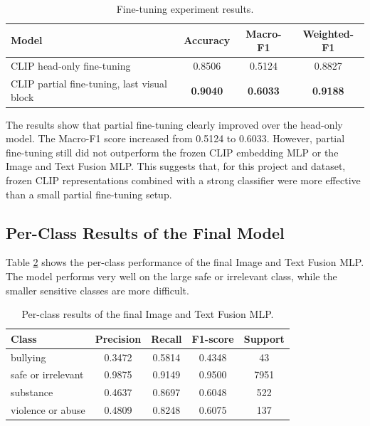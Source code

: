 \documentclass[12pt]{article}
\begin{document}
\begin{table}[H]
\centering
\begin{tabular}{lccc}
\toprule
\textbf{Model} & \textbf{Accuracy} & \textbf{Macro-F1} & \textbf{Weighted-F1} \\
\midrule
CLIP head-only fine-tuning & 0.8506 & 0.5124 & 0.8827 \\
CLIP partial fine-tuning, last visual block & \textbf{0.9040} & \textbf{0.6033} & \textbf{0.9188} \\
\bottomrule
\end{tabular}
\caption{Fine-tuning experiment results.}
\label{tab:fine_tuning_results}
\end{table}

The results show that partial fine-tuning clearly improved over the head-only model. The Macro-F1 score increased from 0.5124 to 0.6033. However, partial fine-tuning still did not outperform the frozen CLIP embedding MLP or the Image and Text Fusion MLP. This suggests that, for this project and dataset, frozen CLIP representations combined with a strong classifier were more effective than a small partial fine-tuning setup.

\subsection{Per-Class Results of the Final Model}

Table \ref{tab:per_class_final} shows the per-class performance of the final Image and Text Fusion MLP. The model performs very well on the large safe or irrelevant class, while the smaller sensitive classes are more difficult.

\begin{table}[H]
\centering
\begin{tabular}{lcccc}
\toprule
\textbf{Class} & \textbf{Precision} & \textbf{Recall} & \textbf{F1-score} & \textbf{Support} \\
\midrule
bullying & 0.3472 & 0.5814 & 0.4348 & 43 \\
safe or irrelevant & 0.9875 & 0.9149 & 0.9500 & 7951 \\
substance & 0.4637 & 0.8697 & 0.6048 & 522 \\
violence or abuse & 0.4809 & 0.8248 & 0.6075 & 137 \\
\bottomrule
\end{tabular}
\caption{Per-class results of the final Image and Text Fusion MLP.}
\label{tab:per_class_final}
\end{table}
\end{document}
